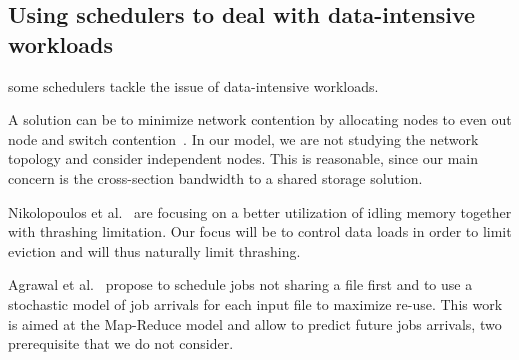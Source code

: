 \documentclass[conference,10pt]{IEEEtran}
\begin{document}


\subsection{Using schedulers to deal with data-intensive workloads}

some schedulers tackle the issue of data-intensive workloads.

A solution can be to minimize network contention by allocating nodes to even out node and
switch contention~\cite{minimize_network_contention}. 
In our model, we are not studying the network topology and consider independent nodes.
This is reasonable, since our main concern is the cross-section bandwidth to a shared storage solution.

Nikolopoulos et al.~\cite{Nikolopoulos2003AdaptiveSU}
are focusing on a better utilization of idling memory together with 
thrashing limitation.
Our focus will be to control data loads in order to limit eviction
and will thus naturally limit thrashing.

Agrawal et al.~\cite{Scheduling_Shared_Scans_of_Large_Data_Files}
propose to schedule jobs not sharing a file first
and to use a stochastic model of job arrivals for each input file to maximize re-use.
This work is aimed at the Map-Reduce model and allow to predict future jobs arrivals, two prerequisite that we do not consider.
\end{document}
